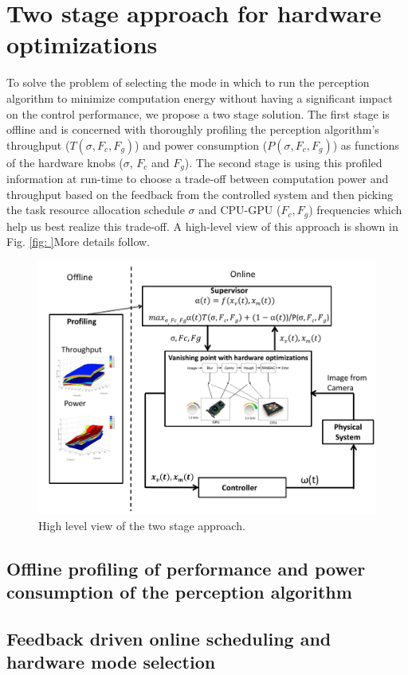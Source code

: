 \section{Two stage approach for hardware optimizations}

To solve the problem of selecting the mode in which to run the perception algorithm to minimize computation energy without having a significant impact on the control performance, we propose a two stage solution. The first stage is offline and is concerned with thoroughly profiling the perception algorithm's throughput ($T(\sigma,F_c,F_g)$) and power consumption ($P(\sigma,F_c,F_g)$) as functions of the hardware knobs ($\sigma$, $F_c$ and $F_g$). The second stage is using this profiled information at run-time to choose a trade-off between computation power and throughput based on the feedback from the controlled system and then picking the task resource allocation schedule $\sigma$ and CPU-GPU ($F_c,F_g$) frequencies which help us best realize this trade-off. A high-level view of this approach is shown in Fig. \ref{fig: }More details follow.


\begin{figure}[htbp]
	\centering
	\includegraphics[scale=0.36]{Figs/bigFig.pdf}
	\caption{High level view of the two stage approach.}
	\label{fig:juicyj}%
\end{figure}


\subsection{Offline profiling of performance and power consumption of the perception algorithm}
\label{sec:profiling}


\subsection{Feedback driven online scheduling and hardware mode selection}
\label{sec:scheduling}

